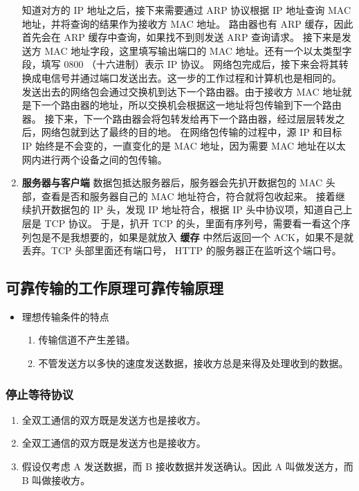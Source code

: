 \documentclass[11pt]{article}
\begin{document}
\begin{enumerate}
知道对方的 IP 地址之后，接下来需要通过 ARP 协议根据 IP 地址查询 MAC 地址，并将查询的结果作为接收方 MAC 地址。
路由器也有 ARP 缓存，因此首先会在 ARP 缓存中查询，如果找不到则发送 ARP 查询请求。
接下来是发送方 MAC 地址字段，这里填写输出端口的 MAC 地址。还有一个以太类型字段，填写 0800 （十六进制）表示 IP 协议。
网络包完成后，接下来会将其转换成电信号并通过端口发送出去。这一步的工作过程和计算机也是相同的。
发送出去的网络包会通过交换机到达下一个路由器。由于接收方 MAC 地址就是下一个路由器的地址，所以交换机会根据这一地址将包传输到下一个路由器。
接下来，下一个路由器会将包转发给再下一个路由器，经过层层转发之后，网络包就到达了最终的目的地。
在网络包传输的过程中，源 IP 和目标 IP 始终是不会变的，一直变化的是 MAC 地址，因为需要 MAC 地址在以太网内进行两个设备之间的包传输。
\item \textbf{服务器与客户端}
数据包抵达服务器后，服务器会先扒开数据包的 MAC 头部，查看是否和服务器自己的 MAC 地址符合，符合就将包收起来。
接着继续扒开数据包的 IP 头，发现 IP 地址符合，根据 IP 头中协议项，知道自己上层是 TCP 协议。
于是，扒开 TCP 的头，里面有序列号，需要看一看这个序列包是不是我想要的，如果是就放入 \textbf{缓存} 中然后返回一个 ACK，如果不是就丢弃。TCP 头部里面还有端口号， HTTP 的服务器正在监听这个端口号。
\end{enumerate}
\subsection{可靠传输的工作原理\hfill{}\textsc{可靠传输原理}}
\label{sec:org4f55d8a}

\begin{itemize}
\item 理想传输条件的特点
\begin{enumerate}
\item 传输信道不产生差错。
\item 不管发送方以多快的速度发送数据，接收方总是来得及处理收到的数据。
\end{enumerate}
\end{itemize}
\subsubsection{停止等待协议}
\label{sec:orge5e3973}
\begin{enumerate}
\item 全双工通信的双方既是发送方也是接收方。
\item 全双工通信的双方既是发送方也是接收方。
\item 假设仅考虑 A 发送数据，而 B 接收数据并发送确认。因此 A 叫做发送方，而 B 叫做接收方。
\end{enumerate}
\end{document}
